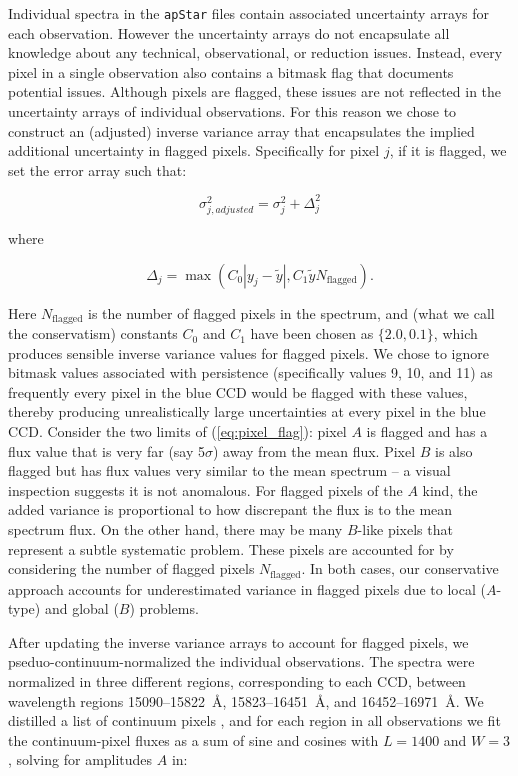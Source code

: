\documentclass[12pt,preprint]{aastex}
\begin{document}
Individual spectra in the \texttt{apStar} files contain associated uncertainty arrays
for each observation.  However the uncertainty arrays do not encapsulate all knowledge
about any technical, observational, or reduction issues.  Instead, every pixel
in a single observation also contains a bitmask flag that documents potential
issues.  Although pixels are flagged, these issues are not reflected in the
uncertainty arrays of individual observations.  For this reason we chose to construct
an (adjusted) inverse variance array that encapsulates the implied additional 
uncertainty in flagged pixels.  Specifically for pixel $j$, if it is flagged, we set the error
array such that:

\begin{equation}
\sigma_{j,adjusted}^2 = \sigma_{j}^2 + \Delta_{j}^2
\end{equation}

\noindent{}where

\begin{equation}
\Delta_{j} = \max{\left(C_{0}|y_{j} - \widetilde{y}|,C_{1}\widetilde{y}N_\mathrm{flagged}\right)} .
\label{eq:pixel_flag}
\end{equation}

Here $N_\mathrm{flagged}$ is the number of flagged pixels in the spectrum, and (what
we call the conservatism) constants $C_0$ and $C_1$ have been chosen as 
$\{2.0,0.1\}$, which produces sensible inverse variance values for flagged
pixels.  We chose to ignore bitmask values associated with persistence 
(specifically values 9, 10, and 11) as frequently every pixel in the blue CCD
would be flagged with these values, thereby producing unrealistically large 
uncertainties at every pixel in the blue CCD.  Consider the two limits of (\ref{eq:pixel_flag}):
pixel $A$ is flagged and has a flux value that is very far (say 5$\sigma$) 
away from the mean flux. Pixel $B$ is also flagged but has flux values very
similar to the mean spectrum -- a visual inspection suggests it is not anomalous.
For flagged pixels of the $A$ kind, the added variance is proportional to how
discrepant the flux is to the mean spectrum flux. On the other hand, there may be many 
$B$-like pixels that represent a subtle systematic problem. These pixels are
accounted for by considering the number of flagged pixels $N_\mathrm{flagged}$. In both
cases, our conservative approach accounts for underestimated variance in flagged pixels 
due to local ($A$-type) and global ($B$) problems.


After updating the inverse variance arrays to account for flagged pixels, we
pseduo-continuum-normalized the individual observations. The spectra were 
normalized in three different regions, corresponding to each CCD, between
wavelength regions 15090--15822~\AA, 15823--16451~\AA, and 16452--16971~\AA.
We distilled a list of continuum pixels \citep[following the initial 
identification in][]{tc}, and for each region in all observations we fit
the continuum-pixel fluxes as a sum of sine and cosines with $L = 1400$ and 
$W = 3$, solving for amplitudes $A$ in:
\end{document}
